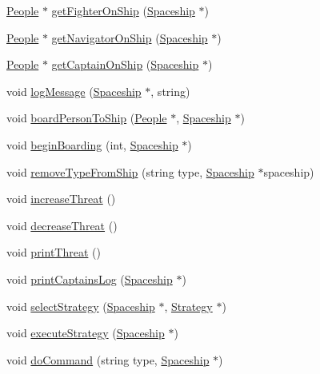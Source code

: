 \begin{DoxyCompactItemize}
\item 
\hyperlink{classPeople}{People} $\ast$ \hyperlink{classFacade_ad1ebea64b1784cc42842ccb3271c848b}{get\+Fighter\+On\+Ship} (\hyperlink{classSpaceship}{Spaceship} $\ast$)
\item 
\hyperlink{classPeople}{People} $\ast$ \hyperlink{classFacade_aaf96fa03ebaa18acbd776e9f93545784}{get\+Navigator\+On\+Ship} (\hyperlink{classSpaceship}{Spaceship} $\ast$)
\item 
\hyperlink{classPeople}{People} $\ast$ \hyperlink{classFacade_ac12365765267ad5cc81b4eae205cf989}{get\+Captain\+On\+Ship} (\hyperlink{classSpaceship}{Spaceship} $\ast$)
\item 
void \hyperlink{classFacade_a71538ab2a843ef79bc998fb494b78591}{log\+Message} (\hyperlink{classSpaceship}{Spaceship} $\ast$, string)
\item 
void \hyperlink{classFacade_adbdce0c4dbae689cc1eca07ff861483d}{board\+Person\+To\+Ship} (\hyperlink{classPeople}{People} $\ast$, \hyperlink{classSpaceship}{Spaceship} $\ast$)
\item 
void \hyperlink{classFacade_a353ace75af9123f863869c57f9ba1e88}{begin\+Boarding} (int, \hyperlink{classSpaceship}{Spaceship} $\ast$)
\item 
void \hyperlink{classFacade_ad0bc0c8387b51b0ead3499747ba846cd}{remove\+Type\+From\+Ship} (string type, \hyperlink{classSpaceship}{Spaceship} $\ast$spaceship)
\item 
void \hyperlink{classFacade_ab7da0040c4f6f61a0bbff3cb0d4114ea}{increase\+Threat} ()
\item 
void \hyperlink{classFacade_ac64e351ea722a24829220fec59d7855f}{decrease\+Threat} ()
\item 
void \hyperlink{classFacade_a26a101d8f1a70a6af2eee1af45ca3ab8}{print\+Threat} ()
\item 
void \hyperlink{classFacade_a1e5bd61cd66ac14d31c02b2c1eebc015}{print\+Captains\+Log} (\hyperlink{classSpaceship}{Spaceship} $\ast$)
\item 
void \hyperlink{classFacade_a284506af0f160efbe15bb93dfccb792e}{select\+Strategy} (\hyperlink{classSpaceship}{Spaceship} $\ast$, \hyperlink{classStrategy}{Strategy} $\ast$)
\item 
void \hyperlink{classFacade_a46b8ea3a69b017548c7eaf207f674976}{execute\+Strategy} (\hyperlink{classSpaceship}{Spaceship} $\ast$)
\item 
void \hyperlink{classFacade_a4c49632c6a0cfc98ed5ffa5d4fe7575b}{do\+Command} (string type, \hyperlink{classSpaceship}{Spaceship} $\ast$)
\item 

\end{DoxyCompactItemize}
